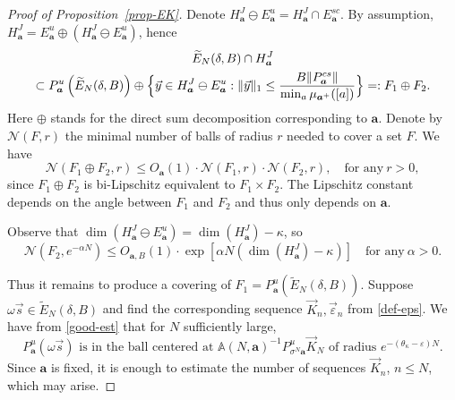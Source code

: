 \documentclass[JEP,XML,SOM,Unicode]{cedram}
\newcommand{\sep}{:}
\let\epsilon\varepsilon
\theoremstyle{plain}
\theoremstyle{definition}
\let\wt\widetilde
\newcommand\bom{{\boldsymbol a}}\let\ba\bom
\let\eps\varepsilon
\let\om\omega
\let\sig\sigma
\newcommand\Ns{{\mathscr N}}
\newcommand\Aa{\mathbb{A}}
\newcommand\be{\begin{equation}}
\newcommand\ee{\end{equation}}
\begin{document}
\begin{proof}[Proof of Proposition~\ref{prop-EK}]
Denote $H_\bom^J \ominus E_\bom^u = H^J_{\bom}\cap E^{sc}_\bom$.
By assumption, $H_\bom^J = E^u_\bom \oplus (H_\bom^J \ominus E_\bom^u)$, hence
\begin{multline}
\label{eq-prod}
\wt E_N(\delta,B)\cap H_\bom^J\\
\subset P_\bom^u\left(\wt E_N(\delta,B)\right) \oplus \Bigl\{\vec y\in H_\bom^J \ominus E_\bom^u\sep \|\vec y\|_1 \le \frac{B\|P_\bom^{cs}\|}{\min_a\mu_{\bom^+}([a])}\Bigr\}=: F_1\oplus F_2.
\end{multline}
Here $\oplus$ stands for the direct sum decomposition corresponding to $\bom$. Denote by $\Ns(F,r)$ the minimal number of balls of radius $r$ needed to cover a set $F$. We have
\be \label{eq-produ2}
\Ns(F_1\oplus F_2,r) \le O_\bom(1)\cdot \Ns(F_1,r)\cdot \Ns(F_2,r),\quad \text{for any}\ r>0,
\ee
since $F_1\oplus F_2$ is bi-Lipschitz equivalent to $F_1\times F_2$. The Lipschitz constant depends on the angle between $F_1$ and $F_2$ and thus only depends on $\ba$.

Observe that $\dim(H_\bom^J \ominus E_\bom^u)=\dim(H_\bom^J)-\kappa$, so
\be \label{cover1}
\Ns(F_2,e^{-\alpha N}) \le O_{\bom,B}(1)\cdot \exp\left[\alpha N (\dim(H_\bom^J)-\kappa)\right]\quad \text{for any}\ \alpha>0.
\ee

Thus it remains to produce a covering of $F_1=P_\bom^u(\wt E_N(\delta,B))$.
Suppose $\om\vec{s} \in \wt E_N(\delta,B)$ and find the
corresponding sequence $\vec K_{n}, \vec\eps_{n}$ from \eqref{def-eps}. We have from \eqref{good-est} that for $N$ sufficiently large,
\be \label{eqrad}
\text{$P_\bom^u(\om\vec s)$ is in the ball centered at $\Aa(N,\bom)^{-1} P_{\sig^N\bom}^u \vec{K}_N$ of radius $e^{-(\theta_\kappa-\epsilon)N}$.}
\ee
Since $\bom$ is fixed, it is enough to estimate
the number of sequences $\vec K_{n}$, $n\le N$, which may arise.


\end{proof}
\end{document}
